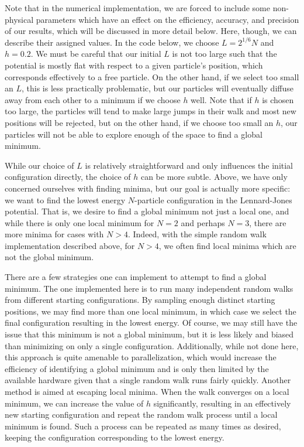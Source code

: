 Note that in the numerical implementation, we are forced to include some non-physical parameters which have an effect on the efficiency, accuracy, and precision of our results, which will be discussed in more detail below.
Here, though, we can describe their assigned values.
In the code below, we choose $L = 2^{1/6} N$ and $h = 0.2$.
We must be careful that our initial $L$ is not too large such that the potential is mostly flat with respect to a given particle's position, which corresponds effectively to a free particle.
On the other hand, if we select too small an $L$, this is less practically problematic, but our particles will eventually diffuse away from each other to a minimum if we choose $h$ well.
Note that if $h$ is chosen too large, the particles will tend to make large jumps in their walk and most new positions will be rejected, but on the other hand, if we choose too small an $h$, our particles will not be able to explore enough of the space to find a global minimum.

While our choice of $L$ is relatively straightforward and only influences the initial configuration directly, the choice of $h$ can be more subtle.
Above, we have only concerned ourselves with finding minima, but our goal is actually more specific: we want to find the lowest energy $N$-particle configuration in the Lennard-Jones potential.
That is, we desire to find a global minimum not just a local one, and while there is only one local minimum for $N = 2$ and perhaps $N = 3$, there are more minima for cases with $N > 4$.
Indeed, with the simple random walk implementation described above, for $N > 4$, we often find local minima which are not the global minimum.

There are a few strategies one can implement to attempt to find a global minimum.
The one implemented here is to run many independent random walks from different starting configurations.
By sampling enough distinct starting positions, we may find more than one local minimum, in which case we select the final configuration resulting in the lowest energy.
Of course, we may still have the issue that this minimum is not a global minimum, but it is less likely and biased than minimizing on only a single configuration.
Additionally, while not done here, this approach is quite amenable to parallelization, which would increase the efficiency of identifying a global minimum and is only then limited by the available hardware given that a single random walk runs fairly quickly.
Another method is aimed at escaping local minima.
When the walk converges on a local minimum, we can increase the value of $h$ significantly, resulting in an effectively new starting configuration and repeat the random walk process until a local minimum is found.
Such a process can be repeated as many times as desired, keeping the configuration corresponding to the lowest energy.


